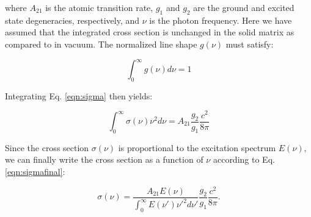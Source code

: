 \noindent
where $A_{21}$ is the atomic transition rate, $g_1$ and $g_2$ are the ground and excited state degeneracies, respectively, and $\nu$ is the photon frequency.  Here we have assumed that the integrated cross section is unchanged in the solid matrix as compared to in vacuum.  The normalized line shape $g(\nu)$ must satisfy:

\begin{equation}
\int_{0}^{\infty} g(\nu) d\nu = 1
\label{eqn:g}
\end{equation}

\noindent
Integrating Eq. \ref{eqn:sigma} then yields:

\begin{equation}
\int_{0}^{\infty} \sigma(\nu) \nu^2 d\nu = A_{21} \frac{g_2}{g_1} \frac{c^2}{8 \pi}
\label{eqn:sigma2}
\end{equation}

\noindent
Since the cross section $\sigma(\nu)$ is proportional to the excitation spectrum $E(\nu)$, we can finally write the cross section as a function of $\nu$ according to Eq. \ref{eqn:sigmafinal}:

\begin{equation}
\sigma(\nu) = \frac{A_{21} E(\nu)}{\int_{0}^{\infty} E(\nu') \nu'^2 d\nu'} \frac{g_2}{g_1} \frac{c^2}{8 \pi}.
\label{eqn:sigmafinal}
\end{equation}